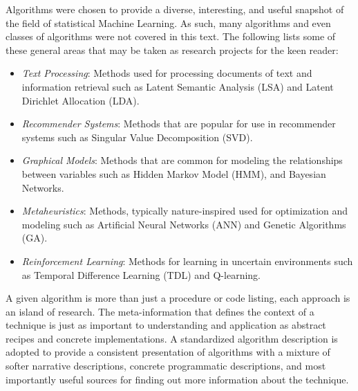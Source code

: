 Algorithms were chosen to provide a diverse, interesting, and useful snapshot of the field of statistical Machine  Learning. As such, many algorithms and even classes of algorithms were not covered in this text. The following lists some of these general areas that may be taken as research projects for the keen reader:

\begin{itemize}
	\item \emph{Text Processing}: Methods used for processing documents of text and information retrieval such as Latent Semantic Analysis (LSA) and Latent Dirichlet Allocation (LDA).
	\item \emph{Recommender Systems}: Methods that are popular for use in recommender systems such as Singular Value Decomposition (SVD).
	\item \emph{Graphical Models}: Methods that are common for modeling the relationships between variables such as Hidden Markov Model (HMM), and Bayesian Networks.
	\item \emph{Metaheuristics}: Methods, typically nature-inspired used for optimization and modeling such as Artificial Neural Networks (ANN) and Genetic Algorithms (GA).
	\item \emph{Reinforcement Learning}: Methods for learning in uncertain environments such as Temporal Difference Learning (TDL) and Q-learning.
\end{itemize}

A given algorithm is more than just a procedure or code listing, each approach is an island of research. The meta-information that defines the context of a technique is just as important to understanding and application as abstract recipes and concrete implementations. A standardized algorithm description is adopted to provide a consistent presentation of algorithms with a mixture of softer narrative descriptions, concrete programmatic descriptions, and most importantly useful sources for finding out more information about the technique.

